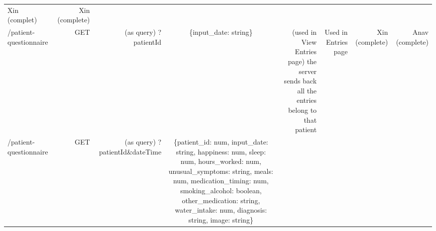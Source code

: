 \documentclass[]{book}
\begin{document}
\begin{longtable}[]{@{}lrrcrrrr@{}}
\begin{minipage}[t]{0.06\columnwidth}
Xin (complet)\strut
\end{minipage} & \begin{minipage}[t]{0.06\columnwidth}\raggedleft\strut
Xin (complete)\strut
\end{minipage}\tabularnewline
\begin{minipage}[t]{0.12\columnwidth}\raggedright\strut
/patient-questionnaire\strut
\end{minipage} & \begin{minipage}[t]{0.13\columnwidth}\raggedleft\strut
GET\strut
\end{minipage} & \begin{minipage}[t]{0.13\columnwidth}\raggedleft\strut
(as query) ?patientId\strut
\end{minipage} & \begin{minipage}[t]{0.14\columnwidth}\centering\strut
\{input\_date: string\}\strut
\end{minipage} & \begin{minipage}[t]{0.06\columnwidth}\raggedleft\strut
(used in View Entries page) the server sends back all the entries belong
to that patient\strut
\end{minipage} & \begin{minipage}[t]{0.06\columnwidth}\raggedleft\strut
Used in Entries page\strut
\end{minipage} & \begin{minipage}[t]{0.06\columnwidth}\raggedleft\strut
Xin (complete)\strut
\end{minipage} & \begin{minipage}[t]{0.06\columnwidth}\raggedleft\strut
Anav (complete)\strut
\end{minipage}\tabularnewline
\begin{minipage}[t]{0.12\columnwidth}\raggedright\strut
/patient-questionnaire\strut
\end{minipage} & \begin{minipage}[t]{0.13\columnwidth}\raggedleft\strut
GET\strut
\end{minipage} & \begin{minipage}[t]{0.13\columnwidth}\raggedleft\strut
(as query) ?patientId\&dateTime\strut
\end{minipage} & \begin{minipage}[t]{0.14\columnwidth}\centering\strut
\{patient\_id: num, input\_date: string, happiness: num, sleep: num,
hours\_worked: num, unusual\_symptoms: string, meals: num,
medication\_timing: num, smoking\_alcohol: boolean, other\_medication:
string, water\_intake: num, diagnosis: string, image: string\}\strut

\end{minipage}
\end{longtable}
\end{document}
